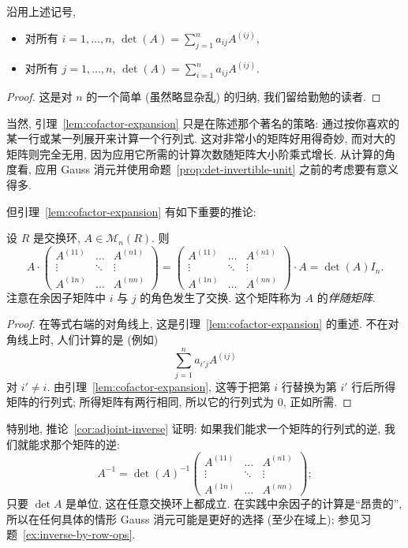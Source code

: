 \begin{lemma}\label{lem:cofactor-expansion}
沿用上述记号,
\begin{itemize}
\item 对所有 $i=1,\ldots,n$, $\det(A)=\sum_{j=1}^n a_{ij}A^{(ij)}$,
\item 对所有 $j=1,\ldots,n$, $\det(A)=\sum_{i=1}^n a_{ij}A^{(ij)}$.
\end{itemize}
\end{lemma}

\begin{proof}
这是对 $n$ 的一个简单 (虽然略显杂乱) 的归纳, 我们留给勤勉的读者.
\end{proof}

当然, 引理~\ref{lem:cofactor-expansion} 只是在陈述那个著名的策略: 通过按你喜欢的某一行或某一列展开来计算一个行列式. 这对非常小的矩阵好用得奇妙, 而对大的矩阵则完全无用, 因为应用它所需的计算次数随矩阵大小阶乘式增长. 从计算的角度看, 应用 Gauss 消元并使用命题~\ref{prop:det-invertible-unit} 之前的考虑要有意义得多.

但引理~\ref{lem:cofactor-expansion} 有如下重要的推论:

\begin{corollary}\label{cor:adjoint-inverse}
设 $R$ 是交换环, $A\in\mathcal{M}_n(R)$. 则
\[
A\cdot\begin{pmatrix} A^{(11)}&\dots&A^{(n1)}\\ \vdots&\ddots&\vdots\\ A^{(1n)}&\dots&A^{(nn)}\end{pmatrix}
=\begin{pmatrix} A^{(11)}&\dots&A^{(n1)}\\ \vdots&\ddots&\vdots\\ A^{(1n)}&\dots&A^{(nn)}\end{pmatrix}\cdot A
=\det(A)I_n.
\]
注意在余因子矩阵中 $i$ 与 $j$ 的角色发生了交换. 这个矩阵称为 $A$ 的\emph{伴随矩阵}.
\end{corollary}

\begin{proof}
在等式右端的对角线上, 这是引理~\ref{lem:cofactor-expansion} 的重述. 不在对角线上时, 人们计算的是 (例如)
\[
\sum_{j=1}^n a_{i'j}A^{(ij)}
\]
对 $i'\neq i$. 由引理~\ref{lem:cofactor-expansion}, 这等于把第 $i$ 行替换为第 $i'$ 行后所得矩阵的行列式; 所得矩阵有两行相同, 所以它的行列式为 $0$, 正如所需.
\end{proof}

特别地, 推论~\ref{cor:adjoint-inverse} 证明: 如果我们能求一个矩阵的行列式的逆, 我们就能求那个矩阵的逆:
\[
A^{-1}=\det(A)^{-1}\begin{pmatrix} A^{(11)}&\dots&A^{(n1)}\\ \vdots&\ddots&\vdots\\ A^{(1n)}&\dots&A^{(nn)}\end{pmatrix};
\]
只要 $\det A$ 是单位, 这在任意交换环上都成立. 在实践中余因子的计算是``昂贵的'', 所以在任何具体的情形 Gauss 消元可能是更好的选择 (至少在域上); 参见习题~\ref{ex:inverse-by-row-ops}.

